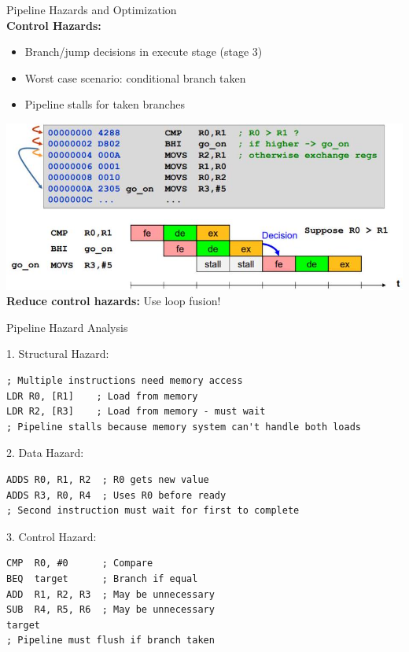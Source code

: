 \columnbreak

\begin{concept}{Pipeline Hazards and Optimization}\\
\textbf{Control Hazards:}
\begin{itemize}
  \item Branch/jump decisions in execute stage (stage 3)
  \item Worst case scenario: conditional branch taken
  \item Pipeline stalls for taken branches
\end{itemize}
\vspace{4mm}
\includegraphics[width=\linewidth]{images/2024_12_29_79e6b22f503fb7b4f718g-15}\\

\textbf{Reduce control hazards:} Use loop fusion!
\end{concept}



\begin{example2}{Pipeline Hazard Analysis}

1. Structural Hazard:
\begin{lstlisting}[language=armasm, style=basesmol]
; Multiple instructions need memory access
LDR R0, [R1]    ; Load from memory
LDR R2, [R3]    ; Load from memory - must wait
; Pipeline stalls because memory system can't handle both loads
\end{lstlisting}

2. Data Hazard:
\begin{lstlisting}[language=armasm, style=basesmol]
ADDS R0, R1, R2  ; R0 gets new value
ADDS R3, R0, R4  ; Uses R0 before ready
; Second instruction must wait for first to complete
\end{lstlisting}

3. Control Hazard:
\begin{lstlisting}[language=armasm, style=basesmol]
CMP  R0, #0      ; Compare
BEQ  target      ; Branch if equal
ADD  R1, R2, R3  ; May be unnecessary
SUB  R4, R5, R6  ; May be unnecessary
target
; Pipeline must flush if branch taken
\end{lstlisting}
\end{example2}

